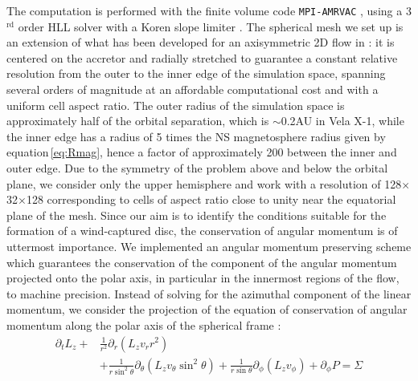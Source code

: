\documentclass{aa}
\makeatletter
\newcommand*{\ns}{NS\@\xspace}
\makeatother
\begin{document}
The computation is performed with the finite volume code \texttt{MPI-AMRVAC} \citep{Xia2017}, using a 3$^{\text{rd}}$ order HLL solver \citep{Toro1994} with a Koren slope limiter \citep{Vreugdenhil1993}. The spherical mesh we set up is an extension of what has been developed for an axisymmetric 2D flow in \cite{ElMellah2015} : it is centered on the accretor and radially stretched to guarantee a constant relative resolution from the outer to the inner edge of the simulation space, spanning several orders of magnitude at an affordable computational cost and with a uniform cell aspect ratio. The outer radius of the simulation space is approximately half of the orbital separation, which is $\sim$0.2AU in Vela X-1, while the inner edge has a radius of 5 times the \ns magnetosphere radius given by equation\,\eqref{eq:Rmag}, hence a factor of approximately 200 between the inner and outer edge. Due to the symmetry of the problem above and below the orbital plane, we consider only the upper hemisphere and work with a resolution of 128$\times$32$\times$128 corresponding to cells of aspect ratio close to unity near the equatorial plane of the mesh. Since our aim is to identify the conditions suitable for the formation of a wind-captured disc, the conservation of angular momentum is of uttermost importance. We implemented an angular momentum preserving scheme which guarantees the conservation of the component of the angular momentum projected onto the polar axis, in particular in the innermost regions of the flow, to machine precision. Instead of solving for the azimuthal component of the linear momentum, we consider the projection of the equation of conservation of angular momentum along the polar axis of the spherical frame \citep[similarly to what was done in polar coordinates by][]{Molteni1999} :
\begin{equation*}
\begin{split}
\partial_t L_z + & \frac{1}{r^2}\partial_r\left(L_z v_{r} r^2 \right) \\
& + \frac{1}{r\sin^2\theta}\partial_{\theta}\left(L_z v_{\theta} \sin^2\theta \right) + \frac{1}{r\sin\theta} \partial_{\phi}\left(L_z v_{\phi}\right) + \partial_{\phi}P=\Sigma
\end{split}
\end{equation*}
\end{document}
